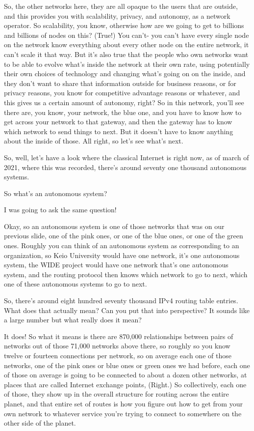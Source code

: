 So, the other networks here, they are all opaque to the users that are outside, and this provides you with scalability, privacy, and autonomy, as a network operator. So scalability, you know, otherwise how are we going to get to billions and billions of nodes on this? (True!) You can't- you can't have every single node on the network know everything about every other node on the entire network, it can't scale it that way. But it's also true that the people who own networks want to be able to evolve what's inside the network at their own rate, using potentially their own choices of technology and changing what's going on on the inside, and they don't want to share that information outside for business reasons, or for privacy reasons, you know for competitive advantage reasons or whatever, and this gives us a certain amount of autonomy, right? So in this network, you'll see there are, you know, your network, the blue one, and you have to know how to get across your network to that gateway, and then the gateway has to know which network to send things to next. But it doesn't have to know anything about the inside of those. All right, so let's see what's next.

So, well, let's have a look where the classical Internet is right now, as of march of 2021, where this was recorded, there's around seventy one thousand autonomous systems.

So what's an autonomous system?

I was going to ask the same question!

Okay, so an autonomous system is one of those networks that was on our previous slide, one of the pink ones, or one of the blue ones, or one of the green ones. Roughly you can think of an autonomous system as corresponding to an organization, so Keio University would have one network, it's one autonomous system, the WIDE project would have one network that's one autonomous system, and the routing protocol then knows which network to go to next, which one of these autonomous systems to go to next.

So, there's around eight hundred seventy thousand IPv4 routing table entries. What does that actually mean? Can you put that into perspective? It sounds like a large number but what really does it mean?

It does! So what it means is there are 870,000 relationships between pairs of networks out of those 71,000 networks above there, so roughly so you know twelve or fourteen connections per network, so on average each one of those networks, one of the pink ones or blue ones or green ones we had before, each one of those on average is going to be connected to about a dozen other networks, at places that are called Internet exchange points, (Right.) So collectively, each one of those, they show up in the overall structure for routing across the entire planet, and that entire set of routes is how you figure out how to get from your own network to whatever service you're trying to connect to somewhere on the other side of the planet.


